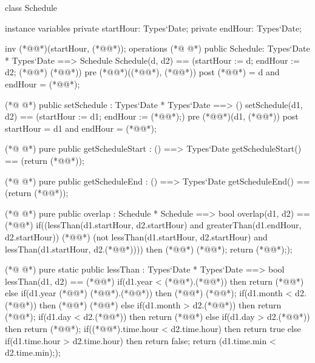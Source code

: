 \begin{vdmpp}[breaklines=true]
class Schedule

instance variables
  private startHour: Types`Date;
  private endHour: Types`Date;
  
  inv (*@@*)(startHour, (*@@*));
operations 
(*@
\label{Schedule:9}
@*)
 public Schedule: Types`Date * Types`Date ==> Schedule
  Schedule(d, d2) == (startHour := d; endHour := d2; (*@@*) (*@@*))
 pre (*@@*)((*@@*), (*@@*))
 post (*@@*) = d and endHour = (*@@*);
 
(*@
\label{setSchedule:14}
@*)
 public setSchedule : Types`Date * Types`Date ==> ()
  setSchedule(d1, d2) == (startHour := d1; endHour := (*@@*);)
 pre (*@@*)(d1, (*@@*))
 post startHour = d1 and endHour = (*@@*);
  
(*@
\label{getScheduleStart:19}
@*)
 pure public getScheduleStart : () ==> Types`Date
  getScheduleStart() == (return (*@@*));
  
(*@
\label{getScheduleEnd:22}
@*)
 pure public getScheduleEnd : () ==> Types`Date
  getScheduleEnd() == (return (*@@*));
 
(*@
\label{overlap:25}
@*)
 pure public overlap : Schedule * Schedule ==> bool
  overlap(d1, d2) == (*@\vdmnotcovered{(}@*)
          if((lessThan(d1.startHour, d2.startHour) and greaterThan(d1.endHour, d2.startHour)) (*@@*)
          (not lessThan(d1.startHour, d2.startHour) and lessThan(d1.startHour, d2.(*@@*))))
           then (*@@*) (*@@*);
          return (*@@*););

(*@
\label{lessThan:32}
@*)
 pure static public lessThan : Types`Date * Types`Date ==> bool
  lessThan(d1, d2) == (*@\vdmnotcovered{(}@*)
          if(d1.year < (*@@*).(*@@*))
           then return (*@@*)
          else if(d1.year (*@\vdmnotcovered{>}@*) (*@@*).(*@@*))
           then (*@@*) (*@@*);
          if(d1.month < d2.(*@@*))
           then (*@@*) (*@@*)
          else if(d1.month > d2.(*@@*))
           then return (*@@*);
          if(d1.day < d2.(*@@*))
           then return (*@@*)
          else if(d1.day > d2.(*@@*))
           then return (*@@*);
          if((*@@*).time.hour < d2.time.hour)
           then return true
          else if(d1.time.hour > d2.time.hour)
           then return false;
          return (d1.time.min < d2.time.min););
          

\end{vdmpp}
